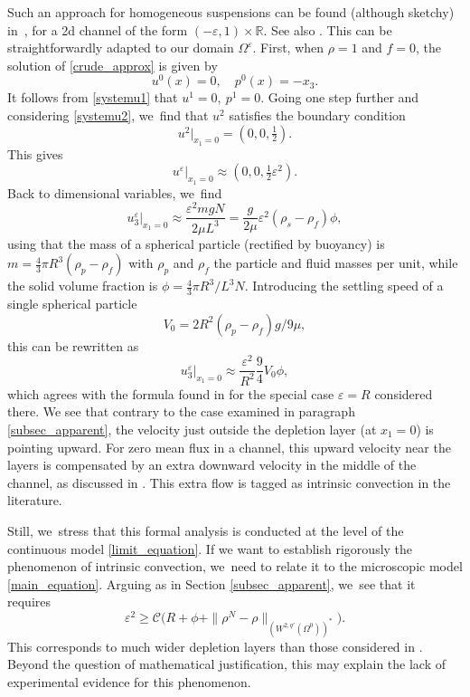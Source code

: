 \documentclass[10pt]{amsart}
\theoremstyle{plain}
\theoremstyle{definition}
\let\eps\varepsilon
\newcommand{\R}{\mathbb{R}}
\begin{document}
Such an approach for homogeneous suspensions can be found (although sketchy) in~\cite{BFAH96}, for a 2d channel of the form $(-\eps,1) \times \R$. See also \cite{BFBA98}. This can be straightforwardly adapted to our domain $\Omega^\eps$. First, when $\rho=1$ and $f=0$, the solution of \eqref{crude_approx} is given by
\[
u^0(x) = 0, \quad p^0(x) = -x_3.
\]
It follows from \eqref{systemu1} that $u^1=0, \: p^1 = 0$.
Going one step further and considering \eqref{systemu2}, we~find that $u^2$ satisfies the boundary condition
\[
u^2\vert_{x_1=0}= (0,0,\tfrac{1}{2}).
\]
This gives
\[
u^\eps\vert_{x_1=0} \approx (0,0, \tfrac{1}{2} \eps^2).
\]
Back to dimensional variables, we~find
\[
u^\eps_3\vert_{x_1=0} \approx \frac{\eps^2 mgN}{2 \mu L^3} = \frac{g}{2\mu} \eps^2 (\rho_s-\rho_f) \phi,
\]
using that the mass of a spherical particle (rectified by buoyancy) is \hbox{$m \!=\! \frac{4}{3} \pi R^3 (\rho_p \!-\! \rho_f)$} with $\rho_p$ and $\rho_f$ the particle and fluid masses per unit, while the solid volume fraction is $\phi = \frac{4}{3}\pi R^3/L^3 N$. Introducing the settling speed of a single spherical particle
\[
V_0 = 2R^2 (\rho_p - \rho_f)g/9\mu,
\]
this can be rewritten as
\[
u^\eps_3\vert_{x_1=0} \approx \frac{\eps^2}{R^2} \frac{9}{4} V_0 \phi,
\]
which agrees with the formula found in \cite{BFAH96} for the special case $\eps = R$ considered there.
We see that contrary to the case examined in paragraph \ref{subsec_apparent}, the velocity just outside the depletion layer (at $x_1=0$) is pointing upward. For zero mean flux in a channel, this upward velocity near the layers is compensated by an extra downward velocity in the middle of the channel, as discussed in \cite{BFAH96}. This extra flow is tagged as intrinsic convection in the literature.

Still, we~stress that this formal analysis is conducted at the level of the continuous model \eqref{limit_equation}. If we want to establish rigorously the phenomenon of intrinsic convection, we~need to relate it to the microscopic model \eqref{main_equation}. Arguing as in Section \ref{subsec_apparent}, we~see that it requires
\[
\eps^2 \ge \mathcal{C} \big(R+ \phi + \|\rho^N-\rho\|_{(W^{2,q'}(\Omega^0))^*} \big).
\]
This corresponds to much wider depletion layers than those considered in \cite{BFAH96}. Beyond the question of mathematical justification, this may explain the lack of experimental evidence for this phenomenon.

\appendix
\end{document}
